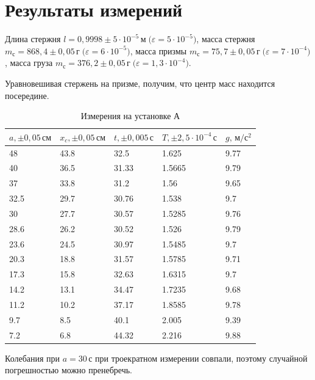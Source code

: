\section{Результаты измерений}

Длина стержня $l=0{,}9998\pm 5\cdot10^{-5}\,\text{м}\;\text{(}\varepsilon=5\cdot10^{-5}\text{)}$,
масса стержня $m_\text{с}=868{,}4\pm0{,}05\,\text{г}\;\text{(}\varepsilon=6\cdot10^{-5}\text{)}$,
масса призмы $m_\text{с}=75{,}7\pm0{,}05\,\text{г}\;\text{(}\varepsilon=7\cdot10^{-4}\text{)}$,
масса груза $m_\text{с}=376{,}2\pm0{,}05\,\text{г}\;\text{(}\varepsilon=1{,}3\cdot10^{-4}\text{)}$.

Уравновешивая стержень на призме, получим, что центр масс находится посередине.

\begin{table}[!ht]
    \centering
    \caption{Измерения на установке А}
    \begin{tabular}{|l|l|l|l|l|}
    \hline
        $a,\pm 0{,}05\,\text{см}$ & $x_c,\pm 0{,}05\,\text{см}$ & $t,\pm 0{,}005\,\text{с}$ & $T,\pm 2{,}5\cdot10^{-4}\,\text{с}$ & $g,\,\text{м}/\text{с}^2$ \\ \hline
        48 & 43.8 & 32.5 & 1.625 & 9.77 \\ \hline
        40 & 36.5 & 31.33 & 1.5665 & 9.79 \\ \hline
        37 & 33.8 & 31.2 & 1.56 & 9.65 \\ \hline
        32.5 & 29.7 & 30.76 & 1.538 & 9.7 \\ \hline
        30 & 27.7 & 30.57 & 1.5285 & 9.76 \\ \hline
        28.6 & 26.2 & 30.52 & 1.526 & 9.79 \\ \hline
        23.6 & 24.5 & 30.97 & 1.5485 & 9.7 \\ \hline
        20.3 & 18.8 & 31.57 & 1.5785 & 9.71 \\ \hline
        17.3 & 15.8 & 32.63 & 1.6315 & 9.7 \\ \hline
        14.2 & 13.1 & 34.47 & 1.7235 & 9.68 \\ \hline
        11.2 & 10.2 & 37.17 & 1.8585 & 9.78 \\ \hline
        9.7 & 8.5 & 40.1 & 2.005 & 9.39 \\ \hline
        7.2 & 6.8 & 44.32 & 2.216 & 9.88 \\ \hline
    \end{tabular}
\end{table}

Колебания при $a=30\,\text{с}$ при троекратном измерении совпали, поэтому
случайной погрешностью можно пренебречь.

